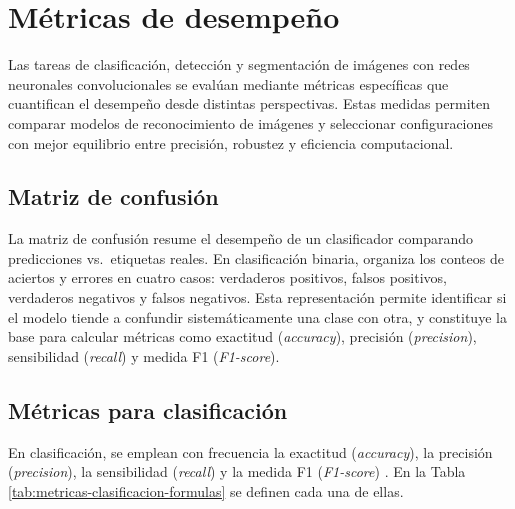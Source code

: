 \endgroup

\vspace{-0.5cm}

\section{Métricas de desempeño}

Las tareas de clasificación, detección y segmentación de imágenes con redes neuronales convolucionales se evalúan mediante métricas específicas que cuantifican el desempeño desde distintas perspectivas. Estas medidas permiten comparar modelos de reconocimiento de imágenes y seleccionar configuraciones con mejor equilibrio entre precisión, robustez y eficiencia computacional.

\subsection{Matriz de confusión}

La matriz de confusión resume el desempeño de un clasificador comparando predicciones vs.\ etiquetas reales. En clasificación binaria, organiza los conteos de aciertos y errores en cuatro casos: verdaderos positivos, falsos positivos, verdaderos negativos y falsos negativos. Esta representación permite identificar si el modelo tiende a confundir sistemáticamente una clase con otra, y constituye la base para calcular métricas como exactitud (\textit{accuracy}), precisión (\textit{precision}), sensibilidad (\textit{recall}) y medida F1 (\textit{F1-score}). 


\subsection{Métricas para clasificación}

En clasificación, se emplean con frecuencia la exactitud (\textit{accuracy}), la precisión (\textit{precision}), la sensibilidad (\textit{recall}) y la medida F1 (\textit{F1-score}) \parencite{gupta2025cnn}. En la Tabla \ref{tab:metricas-clasificacion-formulas} se definen cada una de ellas. \\

